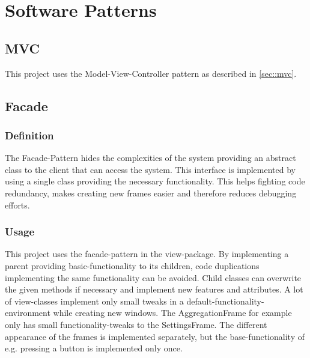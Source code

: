 \documentclass[letterpaper,10pt,english]{sphinxmanual}
\begin{document}
\newpage%


\chapter{Software Patterns}
\label{\detokenize{index:software-patterns}}
\sphinxstepscope

\section{MVC}
This project uses the Model-View-Controller pattern as described in \ref{sec::mvc}.

\section{Facade}

\subsection{Definition}
The Facade-Pattern hides the complexities of the system providing an abstract class to the client that can access the system. This interface is implemented by using a single class providing the necessary functionality. This helps fighting code redundancy, makes creating new frames easier and therefore reduces debugging efforts.

\subsection{Usage}
This project uses the facade-pattern in the view-package. By implementing a parent providing basic-functionality to its children, code duplications implementing the same functionality can be avoided. Child classes can overwrite the given methods if necessary and implement new features and attributes.
A lot of view-classes implement only small tweaks in a default-functionality-environment while creating new windows. The AggregationFrame for example only has small functionality-tweaks to the SettingsFrame. The different appearance of the frames is implemented separately, but the base-functionality of e.g. pressing a button is implemented only once.
\end{document}
